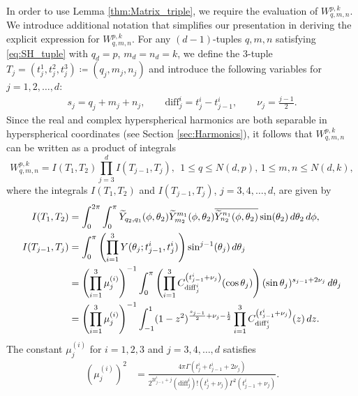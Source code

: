 \documentclass[11pt]{amsart}
\theoremstyle{definition}
\theoremstyle{plain}
\theoremstyle{remark}
\newcommand{\cc}{\overline}
\newcommand{\diff}{\mathrm{diff}}
\begin{document}
In order to use Lemma \ref{thm:Matrix_triple}, we require the evaluation of $W^{p, k}_{q, m, n}$. We introduce additional notation that simplifies our presentation in deriving the explicit expression for $W^{p, k}_{q, m, n}$. For any $(d - 1)$-tuples $q, m, n$ satisfying \eqref{eq:SH_tuple} with $q_d = p$, $m_d = n_d = k$, we define the 3-tuple $T_j = (t_j^1, t_j^2, t_j^3)\coloneqq (q_j, m_j, n_j)$ and introduce the following variables for $j = 1, 2, \dots, d$:  
\begin{align*} 
s_j = q_j + m_j + n_j, \qquad \diff_j^i = t_j^i - t_{j - 1}^i, \qquad \nu_j = \frac{j - 1}{2}. 
\end{align*} 
Since the real and complex hyperspherical harmonics are both separable in hyperspherical coordinates (see Section \ref{sec:Harmonics}), it follows that $W^{p, k}_{q, m, n}$ can be written as a product of integrals  
\begin{equation*} \label{eq:Matrix_3j_prod}
W^{p, k}_{q, m, n} = I(T_1, T_2)\prod_{j = 3}^d I(T_{j - 1}, T_j), \ \ 1\le q\le N(d, p), \, 1\le m, n\le N(d, k), 
\end{equation*} 
where the integrals $I(T_1, T_2)$ and $I(T_{j - 1}, T_j)$, $j = 3, 4, \dots, d$, are given by 
\begin{align} 
\notag I(T_1, T_2) & = \int_0^{2\pi}\int_0^{\pi} \widetilde Y_{q_2, q_1}(\phi, \theta_2)\widetilde Y_{m_2}^{m_1}(\phi, \theta_2)\cc{\widetilde Y_{n_2}^{n_1}(\phi, \theta_2)}\sin(\theta_2)\, d\theta_2\, d\phi, \\ 
\notag I(T_{j - 1}, T_j) & = \int_0^{\pi} \left(\prod_{i = 1}^3 Y(\theta_j; t_{j - 1}^i, t_j^i)\right) \sin^{j - 1}(\theta_j)\, d\theta_j \\ 
\notag & = \left(\prod_{i = 1}^3 \mu_j^{(i)}\right)^{-1} \int_0^\pi \left(\prod_{i = 1}^3 C_{\diff_j^i}^{\left(t_{j - 1}^i + \nu_j\right)}(\cos\theta_j)\right) (\sin\theta_j)^{s_{j - 1} + 2\nu_j}\, d\theta_j \\ 
\label{eq:Matrix_3j_int} & = \left(\prod_{i = 1}^3 \mu_j^{(i)}\right)^{-1} \int_{-1}^1 (1 - z^2)^{\frac{s_{j - 1}}{2} + \nu_j - \frac{1}{2}} \prod_{i = 1}^3 C_{\diff_j^i}^{\left(t_{j - 1}^i + \nu_j\right)}(z)\, dz.  
\end{align} 
The constant $\mu_j^{(i)}$ for $i = 1, 2, 3$ and $j = 3, 4, \dots, d$ satisfies 
\begin{align*} 
\left(\mu_j^{(i)}\right)^2 & = \frac{4\pi\Gamma(t_j^i + t_{j - 1}^i + 2\nu_j)}{2^{2t_{j - 1}^i + j}\left(\diff_j^i\right)!\left(t_j^i + \nu_j\right)\Gamma^2(t_{j - 1}^i + \nu_j)}. 
\end{align*} 
\end{document}
